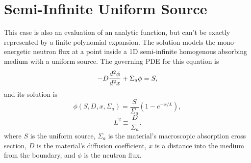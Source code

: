 \section{Semi-Infinite Uniform Source}
This case is also an evaluation of an analytic function, but can't be exactly represented by a finite polynomial expansion.  The solution models the mono-energetic neutron flux at a point inside a 1D semi-infinite homogenous absorbing medium with a uniform source.  The governing PDE for this equation is
\begin{equation}
-D\frac{d^2 \phi}{d^2 x}+\Sigma_a\phi = S,
\end{equation}
and its solution is
\begin{equation}
\phi(S,D,x,\Sigma_a)=\frac{S}{\Sigma_a}\left(1-e^{-x/L}\right),
\end{equation}
\begin{equation}
L^2\equiv \frac{D}{\Sigma_a}.
\end{equation}
where $S$ is the uniform source, $\Sigma_a$ is the material's macroscopic absorption cross section, $D$ is the material's diffusion coefficient, $x$ is a distance into the medium from the boundary, and $\phi$ is the neutron flux.  

